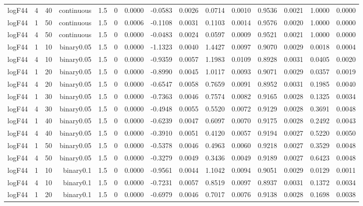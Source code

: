 \begin{longtable}{rrrrrrrrrrrrrrr}
  logF44 & 4 & 40 & continuous & 1.5 & 0 & 0.0000 & -0.0583 & 0.0026 & 0.0714 & 0.0010 & 0.9536 & 0.0021 & 1.0000 & 0.0000 \\ 
  logF44 & 1 & 50 & continuous & 1.5 & 0 & 0.0006 & -0.1108 & 0.0031 & 0.1103 & 0.0014 & 0.9576 & 0.0020 & 1.0000 & 0.0000 \\ 
  logF44 & 4 & 50 & continuous & 1.5 & 0 & 0.0000 & -0.0483 & 0.0024 & 0.0597 & 0.0009 & 0.9521 & 0.0021 & 1.0000 & 0.0000 \\ 
  logF44 & 1 & 10 & binary0.05 & 1.5 & 0 & 0.0000 & -1.1323 & 0.0040 & 1.4427 & 0.0097 & 0.9070 & 0.0029 & 0.0018 & 0.0004 \\ 
  logF44 & 4 & 10 & binary0.05 & 1.5 & 0 & 0.0000 & -0.9359 & 0.0057 & 1.1983 & 0.0109 & 0.8928 & 0.0031 & 0.0405 & 0.0020 \\ 
  logF44 & 1 & 20 & binary0.05 & 1.5 & 0 & 0.0000 & -0.8990 & 0.0045 & 1.0117 & 0.0093 & 0.9071 & 0.0029 & 0.0357 & 0.0019 \\ 
  logF44 & 4 & 20 & binary0.05 & 1.5 & 0 & 0.0000 & -0.6547 & 0.0058 & 0.7659 & 0.0091 & 0.8952 & 0.0031 & 0.1985 & 0.0040 \\ 
  logF44 & 1 & 30 & binary0.05 & 1.5 & 0 & 0.0000 & -0.7363 & 0.0046 & 0.7574 & 0.0082 & 0.9165 & 0.0028 & 0.1325 & 0.0034 \\ 
  logF44 & 4 & 30 & binary0.05 & 1.5 & 0 & 0.0000 & -0.4948 & 0.0055 & 0.5520 & 0.0072 & 0.9129 & 0.0028 & 0.3691 & 0.0048 \\ 
  logF44 & 1 & 40 & binary0.05 & 1.5 & 0 & 0.0000 & -0.6239 & 0.0047 & 0.6097 & 0.0070 & 0.9175 & 0.0028 & 0.2492 & 0.0043 \\ 
  logF44 & 4 & 40 & binary0.05 & 1.5 & 0 & 0.0000 & -0.3910 & 0.0051 & 0.4120 & 0.0057 & 0.9194 & 0.0027 & 0.5220 & 0.0050 \\ 
  logF44 & 1 & 50 & binary0.05 & 1.5 & 0 & 0.0000 & -0.5378 & 0.0046 & 0.4963 & 0.0060 & 0.9218 & 0.0027 & 0.3529 & 0.0048 \\ 
  logF44 & 4 & 50 & binary0.05 & 1.5 & 0 & 0.0000 & -0.3279 & 0.0049 & 0.3436 & 0.0049 & 0.9189 & 0.0027 & 0.6423 & 0.0048 \\ 
  logF44 & 1 & 10 & binary0.1 & 1.5 & 0 & 0.0000 & -0.9561 & 0.0044 & 1.1042 & 0.0094 & 0.9051 & 0.0029 & 0.0129 & 0.0011 \\ 
  logF44 & 4 & 10 & binary0.1 & 1.5 & 0 & 0.0000 & -0.7231 & 0.0057 & 0.8519 & 0.0097 & 0.8937 & 0.0031 & 0.1372 & 0.0034 \\ 
  logF44 & 1 & 20 & binary0.1 & 1.5 & 0 & 0.0000 & -0.6979 & 0.0046 & 0.7017 & 0.0076 & 0.9138 & 0.0028 & 0.1698 & 0.0038 \\ 

\end{longtable}
